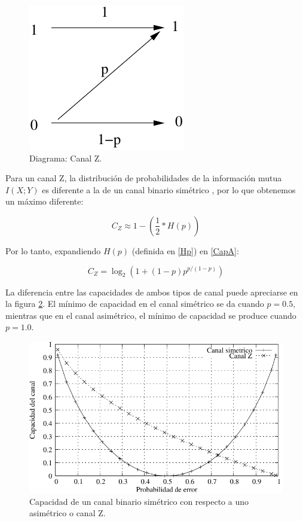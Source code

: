 \begin{figure}[th]
  \begin{center}
    \includegraphics[scale=1]{graphs/zchannel}
  \end{center}
  \caption{Diagrama: Canal Z.}
  \label{fig:Gal}
\end{figure}

Para un canal Z, la distribución de probabilidades de la información mutua $I(X;Y)$ es diferente a la de un canal binario simétrico \cite{Tallini:02}, por lo que obtenemos un máximo diferente:

\begin{equation}\label{CapA}
C_{Z} \approx 1 - \left(\frac{1}{2}*H(p)\right)
\end{equation}

Por lo tanto, expandiendo $H(p)$ (definida en \ref{Hp}) en \ref{CapA}:

$$ C_{Z} = \log_2\left(1+(1-p) p^{p/(1-p)}\right) $$

La diferencia entre las capacidades de ambos tipos de canal puede apreciarse en la figura \ref{fig:CompBZ}. El mínimo de capacidad en el canal simétrico se da cuando $p=0.5$, mientras que en el canal asimétrico, el mínimo de capacidad se produce cuando $p=1.0$.

\begin{figure}[th]
  \begin{center}
    \includegraphics[scale=1.1]{graphs/grafico_comparacion_capacidad_binaria_z}
  \end{center}
  \caption{Capacidad de un canal binario simétrico con respecto a uno asimétrico o canal Z.}
  \label{fig:CompBZ}
\end{figure}



